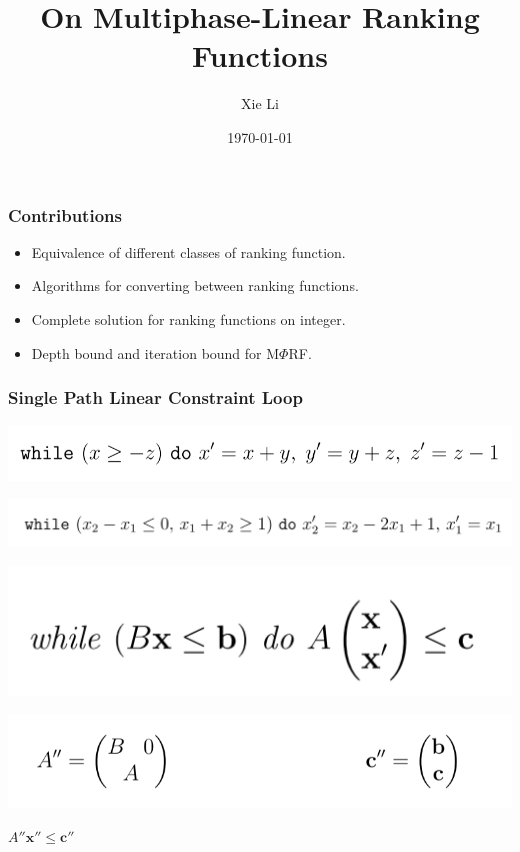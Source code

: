 \documentclass[11pt]{beamer}
\title{On Multiphase-Linear Ranking Functions}
\date{\today}
\author{Xie Li}
\begin{document}
\maketitle

\begin{frame}\frametitle{Contributions}
\begin{itemize}
\item Equivalence of different classes of ranking function.

\item Algorithms for converting between ranking functions.

\item Complete solution for ranking functions on integer.

\item Depth bound and iteration bound for M$\Phi$RF.

\end{itemize}
\end{frame}

\begin{frame}\frametitle{Single Path Linear Constraint Loop}
\begin{example}
\begin{center}

\includegraphics[scale = 0.4]{loopExample.png}

\includegraphics[scale = 0.4]{loopExample1.png}
\end{center}

\end{example}

\begin{definition}[SLC]
\includegraphics[scale = 0.4]{1.png}


\end{definition}
\begin{center}
\includegraphics[scale = 0.35]{2.png}

$A''\textbf{x}'' \le \textbf{c}''$
\end{center}


\end{frame}
\end{document}
